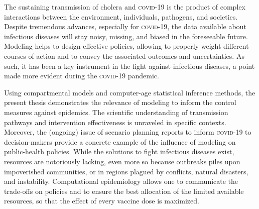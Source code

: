 
The sustaining transmission of cholera and \textsc{covid}-19 is the product of complex interactions between the environment, individuals, pathogens, and societies. Despite tremendous advances, especially for \textsc{covid}-19, the data available about infectious diseases will stay noisy, missing, and biased in the foreseeable future. Modeling helps to design effective policies, allowing to properly weight different courses of action and to convey the associated outcomes and uncertainties. As such, it has been a key instrument in the fight against infectious diseases, a point made more evident during the \textsc{covid}-19 pandemic. 

Using compartmental models and computer-age statistical inference methods, the present thesis demonstrates the relevance of modeling to inform the control measures against epidemics. The scientific understanding of transmission pathways and intervention effectiveness is unraveled in specific contexts. Moreover, the (ongoing) issue of scenario planning reports to inform \textsc{covid}-19 to decision-makers provide a concrete example of the influence of modeling on public-health policies. 
While the solutions to fight infectious diseases exist, resources are notoriously lacking, even more so because outbreaks piles upon impoverished communities, or in regions plagued by conflicts, natural disasters, and instability. Computational epidemiology allows one to communicate the trade-offs on policies and to ensure the best allocation of the limited available resources, so that \eg the effect of every vaccine dose is maximized. %

